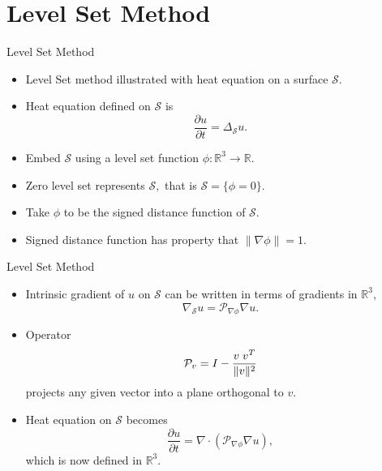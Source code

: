 \documentclass{beamer}
\begin{document}
\section{Level Set Method}
\begin{frame}{Level Set Method}
\begin{itemize}
\item Level Set method illustrated with heat equation on a surface $\mathcal{S}.$
\item Heat equation defined on $\mathcal{S}$ is $$\frac{\partial u}{\partial t} =\Delta_{\mathcal{S}} u.$$
\item Embed $\mathcal{S}$ using a level set function $\phi : \mathbb{R}^3 \rightarrow \mathbb{R}.$ 
\item Zero level set represents $\mathcal{S},$ that is $\mathcal{S} = \{\phi = 0\}.$
\item Take $\phi$ to be the signed distance function of $\mathcal{S}.$ 
\item Signed distance function has property that $\|\nabla \phi\| = 1.$
\end{itemize}
\end{frame}


\begin{frame}{Level Set Method}
\begin{itemize}
\item  Intrinsic gradient of $u$ on $\mathcal{S}$ can be written in terms of gradients in $\mathbb{R}^3,$  $$\nabla_{\mathcal{S}} u = \mathcal{P}_{\nabla \phi} \nabla u.$$

\item Operator $$\mathcal{P}_v=I-\frac{v \hspace{0.1cm} v^T}{\| v \|^2}$$ projects any given vector into a plane orthogonal to $v.$

\item Heat equation on $\mathcal{S}$ becomes $$\frac{\partial u}{\partial t} =\nabla \cdot(\mathcal{P}_{\nabla \phi} \nabla u),$$ which is now defined in $\mathbb{R}^3.$

\end{itemize}
\end{frame}
\end{document}
